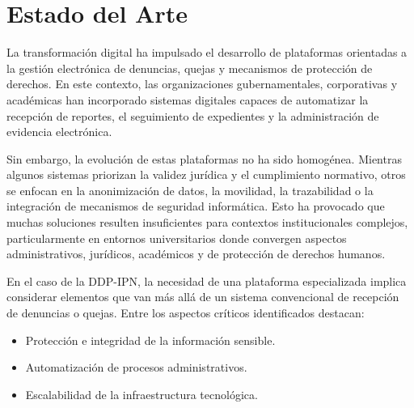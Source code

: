 
\chapter{Estado del Arte}
\label{cap:estado_arte}
\justifying



\begin{flushleft}
\justifying

La transformación digital ha impulsado el desarrollo de plataformas orientadas a la gestión electrónica de denuncias, quejas y mecanismos de protección de derechos. En este contexto, las organizaciones gubernamentales, corporativas y académicas han incorporado sistemas digitales capaces de automatizar la recepción de reportes, el seguimiento de expedientes y la administración de evidencia electrónica.

Sin embargo, la evolución de estas plataformas no ha sido homogénea. Mientras algunos sistemas priorizan la validez jurídica y el cumplimiento normativo, otros se enfocan en la anonimización de datos, la movilidad, la trazabilidad o la integración de mecanismos de seguridad informática. Esto ha provocado que muchas soluciones resulten insuficientes para contextos institucionales complejos, particularmente en entornos universitarios donde convergen aspectos administrativos, jurídicos, académicos y de protección de derechos humanos.

En el caso de la DDP-IPN, la necesidad de una plataforma especializada implica considerar elementos que van más allá de un sistema convencional de recepción de denuncias o quejas. Entre los aspectos críticos identificados destacan:

\begin{itemize}

    \item Protección e integridad de la información sensible.
    
    \item Automatización de procesos administrativos.
    
    \item Escalabilidad de la infraestructura tecnológica.
    

\end{itemize}
\end{flushleft}
